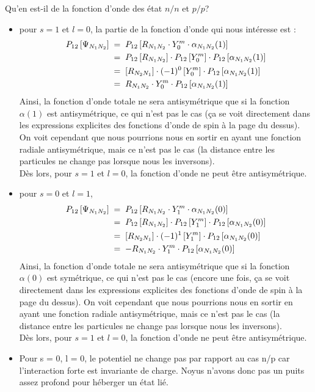 Qu'en est-il de la fonction d'onde des état $n/n$ et $p/p$?
\begin{itemize}
    \item pour $s=1$ et $l=0$, la partie de la fonction d'onde qui nous intéresse est :
    \begin{align*}
        P_{12} \left[ \Psi_{N_1N_2} \right] &\; = \;
        P_{12} \left[ R_{N_1N_2} \cdot Y_0^m \cdot \alpha_{N_1N_2}(1)  \right] \\
        &\; = \;
        P_{12} \left[ R_{N_1N_2} \right]\cdot P_{12} \left[Y_0^m \right]\cdot P_{12} \left[\alpha_{N_1N_2}(1)  \right]\\
        &\; = \;
        \left[ R_{N_2N_1} \right]\cdot (-1)^0\left[Y_0^m \right]\cdot P_{12} \left[\alpha_{N_1N_2}(1)  \right]\\
        &\; = \;
        R_{N_1N_2} \cdot Y_0^m \cdot P_{12} \left[\alpha_{N_1N_2}(1)  \right]
    \end{align*}
    Ainsi, la fonction d'onde totale ne sera antisymétrique que si la fonction $\alpha(1)$ est antisymétrique, ce qui n'est pas le cas (ça se voit directement dans les expressions explicites des fonctions d'onde de spin à la page du dessus). On voit cependant que nous pourrions nous en sortir en ayant une fonction radiale antisymétrique, mais ce n'est pas le cas (la distance entre les particules ne change pas lorsque nous les inversons).\\
    Dès lors, pour $s=1$ et $l=0$, la fonction d'onde ne peut être antisymétrique.\\[4pt]
    
    \item pour $s=0$ et $l=1$, 
    \begin{align*}
        P_{12} \left[ \Psi_{N_1N_2} \right] &\; = \;
        P_{12} \left[ R_{N_1N_2} \cdot Y_1^m \cdot \alpha_{N_1N_2}(0)  \right] \\
        &\; = \;
        P_{12} \left[ R_{N_1N_2} \right]\cdot P_{12} \left[Y_1^m \right]\cdot P_{12} \left[\alpha_{N_1N_2}(0)  \right]\\
        &\; = \;
        \left[ R_{N_2N_1} \right]\cdot (-1)^1\left[Y_1^m \right]\cdot P_{12} \left[\alpha_{N_1N_2}(0)  \right]\\
        &\; = \;
        - R_{N_1N_2} \cdot Y_1^m \cdot P_{12} \left[\alpha_{N_1N_2}(0)  \right]
    \end{align*}
    Ainsi, la fonction d'onde totale ne sera antisymétrique que si la fonction $\alpha(0)$ est symétrique, ce qui n'est pas le cas (encore une fois, ça se voit directement dans les expressions explicites des fonctions d'onde de spin à la page du dessus). On voit cependant que nous pourrions nous en sortir en ayant une fonction radiale antisymétrique, mais ce n'est pas le cas (la distance entre les particules ne change pas lorsque nous les inversons).\\
    Dès lors, pour $s=1$ et $l=0$, la fonction d'onde ne peut être antisymétrique.\\[4pt]
    \item Pour s = 0, l = 0, le potentiel ne change pas par rapport au cas n/p car l'interaction forte est invariante de charge. Noyus n'avons donc pas un puits assez profond pour héberger un état lié.
\end{itemize}

